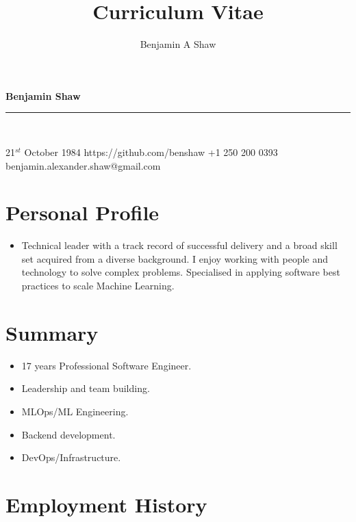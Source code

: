 \documentclass{article}
\title{Curriculum Vitae}
\author{Benjamin A Shaw}
\begin{document}
{\huge{\color{slateblue}\textbf{Benjamin Shaw}}}\\
\rule{\textwidth}{0.5mm}\\

\begin{personaldetails}
{21$^{st}$ October 1984}
{https://github.com/benshaw}
{+1 250 200 0393}
{benjamin.alexander.shaw@gmail.com}
\end{personaldetails}


\section*{Personal Profile}
\begin{itemize}
  \item Technical leader with a track record of successful delivery and a broad skill set acquired from a diverse background. I enjoy working with people and technology to solve complex problems. Specialised in applying software best practices to scale Machine Learning.
\end{itemize}

\section*{Summary}
\begin{itemize}
  \item 17 years Professional Software Engineer.
  \item Leadership and team building.
  \item MLOps/ML Engineering.
  \item Backend development.
  \item DevOps/Infrastructure.
\end{itemize}

\section*{Employment History}
\end{document}
